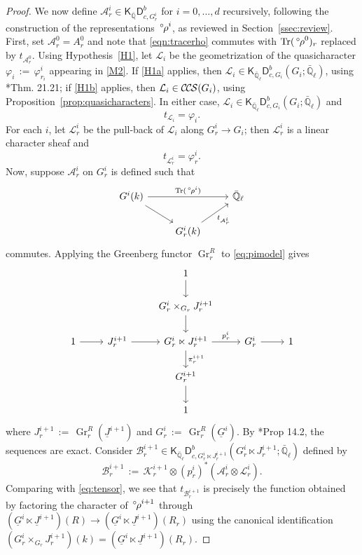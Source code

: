 \documentclass[10pt]{amsart}
\theoremstyle{plain}
\theoremstyle{definition}
\newcommand{\QQ}{{\mathbb{Q}}}
\newcommand{\EE}{\mathbb{\bar Q}_\ell}
\newcommand{\Fq}{k}
\DeclareMathOperator{\Gr}{Gr}
\DeclareMathOperator{\trace}{Tr}
\newcommand{\ceq}{{\, :=\, }}
\newcommand{\trFrob}[1]{t_{#1}}
\newcommand{\cs}[1]{{\mathcal{#1}}}
\newcommand{\CCS}{{\mathcal{C\hskip-.8pt C\hskip-0.8pt S}}}
\newcommand{\orho}{{\,^\circ \hskip-1pt \rho}}
\begin{document}
\begin{proof}
We now define $\cs{A}^i_r  \in \mathsf{K}_{\bar\QQ}\mathsf{D}^b_{c,G^i_r}$ for $i=0,\ldots ,d$ recursively, following the construction of the representations $\orho^i$, as reviewed in Section~\ref{ssec:review}.
First, set $\cs{A}_r^0 = A_r^0$ and note that \eqref{eqn:tracerho} commutes with $\trace(\orho^0)_r$ replaced by $\trFrob{\cs{A}_r^0}$.
Using Hypothesis~\ref{H1}, let $\cs{L}_i$ be the geometrization of the quasicharacter $\varphi_i \ceq \varphi^i_{r_i}$ appearing in \ref{M2}.
If \ref{H1a} applies, then $\cs{L}_i \in \mathsf{K}_{\EE}\mathsf{D}^b_{c,G_i}(G_i;\EE)$, using \cite{lusztig:disconnected4}*{Thm. 21.21};
if \ref{H1b} applies, then $\cs{L}_i\in \CCS(G_i)$, using Proposition~\ref{prop:quasicharacters}. 
In either case, $\cs{L}_i\in \mathsf{K}_{\EE}\mathsf{D}^b_{c,G_i}(G_i;\EE)$ and
\[
\trFrob{\cs{L}_i} = \varphi_i.
\]
For each $i$, let $\cs{L}^i_{r}$ be the pull-back of $\cs{L}_i$ along $G^i_{r} \to G_i$; then $\cs{L}^i_{r}$ is a linear character sheaf and
\[
\trFrob{\cs{L}^i_{r}} = \varphi^i_{r}.
\]
Now, suppose $\cs{A}^i_r$ on $G_r^i$ is defined such that
\[
\begin{tikzcd}
G^i(\Fq) \arrow{rr}{\trace(\orho^i)} \arrow{rd} && \EE\\
& G_r^i(\Fq) \arrow{ru}[swap]{\trFrob{\cs{A}_r^i}} & 
\end{tikzcd}
\]
commutes.
Applying the Greenberg functor $\Gr^{R}_r$ to \eqref{eq:pimodel} gives
\begin{equation}\label{eq:pi}
\begin{tikzcd}
\ && 1 \arrow{d} && \\
\ && G_r^{i}\times_{G_r} J_r^{i+1} \arrow{d} && \\
1 \arrow{r} & J_r^{i+1} \arrow{r} & G_r^i \ltimes J_r^{i+1} \arrow{d}{\pi_r^{i+1}} \arrow{r}{p_r^{i}} & G_r^i \arrow{r} & 1\\
&& G_r^{i+1} \arrow{d} && \\
&& 1 && 
\end{tikzcd}
\end{equation}
where $J_r^{i+1} \ceq \Gr^{R}_r(\underline{J}^{i+1})$ and $G_r^{i} \ceq \Gr^{R}_r(\underline{G}^{i})$.
By \cite{bertapelle-gonzales:Greenberg}*{Prop 14.2}, the sequences are exact.
Consider $\cs{B}_r^{i+1}\in \mathsf{K}_{\EE}\mathsf{D}^b_{c,G_r^{i}\ltimes J_r^{i+1}}(G_r^{i}\ltimes J_r^{i+1};\EE)$ defined by
\[
\cs{B}_r^{i+1} \ceq \cs{K}_r^{i+1} \otimes (p_r^{i})^*(\cs{A}_r^{i}\otimes \cs{L}_r^{i}).
\]
Comparing with \eqref{eq:tensor}, we see that $\trFrob{\cs{B}_r^{i+1}}$ is precisely the function obtained by factoring the character of $\orho^{i+1}$ through $(\underline{G}^{i}\ltimes \underline{J}^{i+1})(R) \to (\underline{G}^{i}\ltimes \underline{J}^{i+1})(R_r)$ using the canonical identification $(G_r^{i}\times_{G_r} J_r^{i+1})(\Fq) =  (\underline{G}^{i}\ltimes \underline{J}^{i+1})(R_r)$. 

\end{proof}
\end{document}
